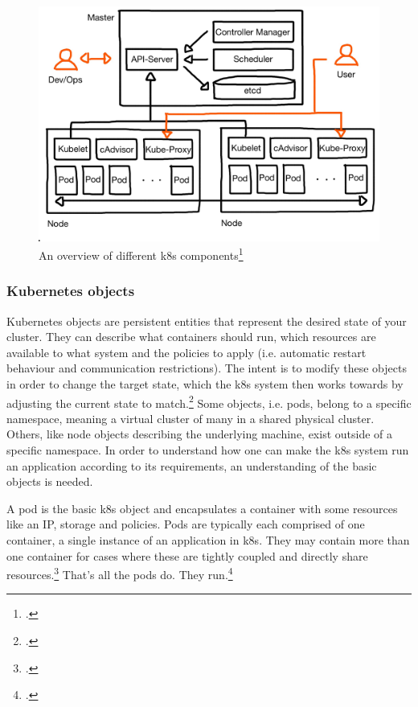 \begin{figure}[H]
\includegraphics[scale=0.2]{pictures/big-picture.JPG} 
\caption{An overview of different \gls{k8s} components\protect\footcite{nicoPictures}}
\label{fig:k8s-big-picture}
\end{figure}


\subsubsection{Kubernetes objects}
Kubernetes objects are persistent entities that represent the desired state of your cluster. They can describe what containers should run, which resources are available to what system and the policies to apply (i.e. automatic restart behaviour and communication restrictions).
The intent is to modify these objects in order to change the target state, which the \gls{k8s} system then works towards by adjusting the current state to match.\footcite[][, section 'Understanding Kubernetes Objects']{k8sObjects}
Some objects, i.e. pods, belong to a specific namespace, meaning a virtual cluster of many in a shared physical cluster. Others, like node objects describing the underlying machine, exist outside of a specific namespace.
In order to understand how one can make the \gls{k8s} system run an application according to its requirements, an understanding of the basic objects is needed.

A pod is the basic \gls{k8s} object and encapsulates a container with some resources like an IP, storage and policies. Pods are typically each comprised of one container, a single instance of an application in \gls{k8s}. They may contain more than one container for cases where these are tightly coupled and directly share resources.\footcite[][, section 'Understanding Pods']{k8sPods}
That's all the pods do. They run.\footcite[][p. 4]{phippy}

